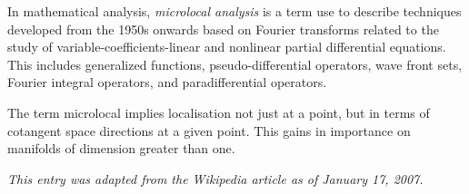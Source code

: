 \documentclass[12pt]{article}
\begin{document}
In mathematical analysis, {\em microlocal analysis} is a term use to describe techniques developed from the 1950s onwards based on Fourier transforms related to the study of variable-coefficients-linear and nonlinear partial differential equations. This includes generalized functions, pseudo-differential operators, wave front sets, Fourier integral operators, and paradifferential operators.

The term microlocal implies localisation not just at a point, but in terms of cotangent space directions at a given point. This gains in importance on manifolds of dimension greater than one.

{\it This entry was adapted from the Wikipedia article  as of January 17, 2007.}
\end{document}
